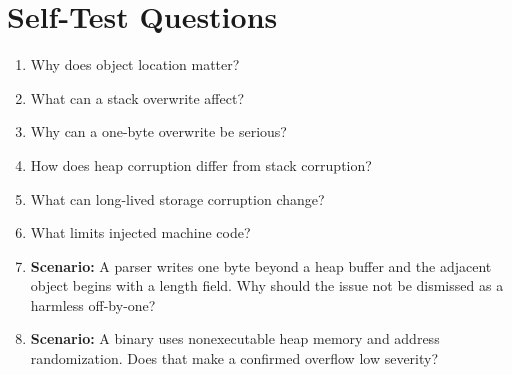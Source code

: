\documentclass[11pt,letterpaper]{article}
\begin{document}
\section{Self-Test Questions}
\begin{enumerate}
\item Why does object location matter?
\item What can a stack overwrite affect?
\item Why can a one-byte overwrite be serious?
\item How does heap corruption differ from stack corruption?
\item What can long-lived storage corruption change?
\item What limits injected machine code?
\item \textbf{Scenario:} A parser writes one byte beyond a heap buffer and the adjacent object begins with a length field. Why should the issue not be dismissed as a harmless off-by-one?
\item \textbf{Scenario:} A binary uses nonexecutable heap memory and address randomization. Does that make a confirmed overflow low severity?
\end{enumerate}
\clearpage
\end{document}
